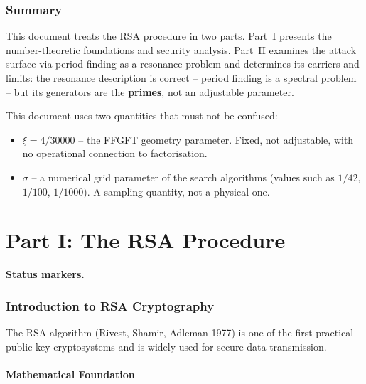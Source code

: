 
\section*{Summary}

This document treats the RSA procedure in two parts. Part~I presents
the number-theoretic foundations and security analysis. Part~II
examines the attack surface via period finding as a resonance problem
and determines its carriers and limits: the resonance description is
correct -- period finding is a spectral problem -- but its generators
are the \textbf{primes}, not an adjustable parameter.

\begin{keyresult}
This document uses two quantities that must not be confused:
\begin{itemize}
  \item $\xi = 4/30000$ -- the FFGFT geometry parameter. Fixed, not
    adjustable, with no operational connection to factorisation.
  \item $\sigma$ -- a numerical grid parameter of the search algorithms
    (values such as $1/42$, $1/100$, $1/1000$). A sampling quantity,
    not a physical one.
\end{itemize}
\end{keyresult}

\part*{Part I: The RSA Procedure}

\medskip\noindent\textbf{Status markers.}


\section{Introduction to RSA Cryptography}

The RSA algorithm (Rivest, Shamir, Adleman 1977) is one of the first
practical public-key cryptosystems and is widely used for secure data
transmission.

\subsection{Mathematical Foundation}

